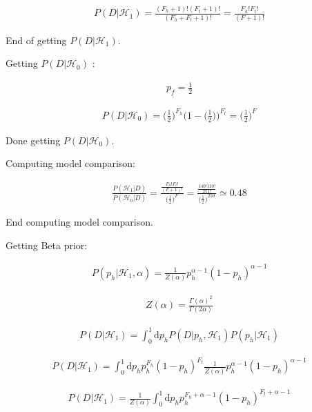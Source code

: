 \documentclass[12pt]{article}
\begin{document}
\begin{gather}
P(D|\mathcal{H}_1) = \frac{(F_h+1)!(F_t+1)!}{(F_h+F_t+1)!} = \frac{F_h!F_t!}{(F+1)!}
\end{gather}

End of getting $P(D|\mathcal{H}_1)$.

Getting $P(D|\mathcal{H}_0)$ :

\begin{gather}
p_f = \frac{1}{2}
\end{gather}

\begin{gather}
P(D|\mathcal{H}_0) = \Big(\frac{1}{2}\Big)^{F_h}\Big(1 - \Big(\frac{1}{2}\Big)\Big)^{F_t} = \Big(\frac{1}{2}\Big)^{F}
\end{gather}


Done getting $P(D|\mathcal{H}_0)$.

Computing model comparison:

\begin{gather}
\frac{P(\mathcal{H}_1 | D)}{P(\mathcal{H}_0 | D)} = \frac{\frac{F_h!F_t!}{(F+1)!}}{\Big(\frac{1}{2}\Big)^{F}} =  \frac{\frac{140!110!}{251!}}{\Big(\frac{1}{2}\Big)^{250}} \simeq 0.48
\end{gather}

End computing model comparison.

Getting Beta prior:

\begin{gather}
P(p_h|\mathcal{H}_1,\alpha) = \frac{1}{Z(\alpha)}   p_h^{\alpha-1}(1-p_h)^{\alpha-1}
\end{gather}

\begin{gather}
Z(\alpha) = \frac{\Gamma(\alpha)^2}{\Gamma(2\alpha)}
\end{gather}

\begin{gather}
P(D|\mathcal{H}_1) = \int_0^1 \! \mathrm{d}p_h P(D|p_h,\mathcal{H}_1)P(p_h|\mathcal{H}_1)
\end{gather}

\begin{gather}
P(D|\mathcal{H}_1) = \int_0^1 \! \mathrm{d}p_h p_h^{F_h}(1 - p_h)^{F_t} \frac{1}{Z(\alpha)}   p_h^{\alpha-1}(1-p_h)^{\alpha-1}
\end{gather}

\begin{gather}
P(D|\mathcal{H}_1) = \frac{1}{Z(\alpha)}   \int_0^1 \! \mathrm{d}p_h p_h^{F_h+\alpha-1}(1 - p_h)^{F_t+\alpha-1}
\end{gather}
\end{document}
